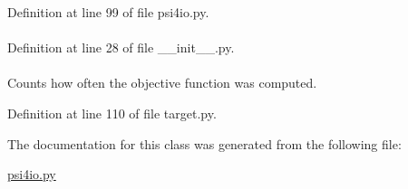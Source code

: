 \-Definition at line 99 of file psi4io.\-py.

\hypertarget{classforcebalance_1_1BaseClass_afd68efa29ccd2f320f4cf82198214aac}{
\paragraph[{verbose\-\_\-options}]{}}\label{classforcebalance_1_1BaseClass_afd68efa29ccd2f320f4cf82198214aac}


\-Definition at line 28 of file \-\_\-\-\_\-init\-\_\-\-\_\-.\-py.

\hypertarget{classforcebalance_1_1target_1_1Target_ad4cd0ab38d8fc97d3e7a6e22ce130a16}{
\paragraph[{xct}]{}}\label{classforcebalance_1_1target_1_1Target_ad4cd0ab38d8fc97d3e7a6e22ce130a16}


\-Counts how often the objective function was computed. 



\-Definition at line 110 of file target.\-py.



\-The documentation for this class was generated from the following file\-:\begin{DoxyCompactItemize}
\item 
\hyperlink{psi4io_8py}{psi4io.\-py}\end{DoxyCompactItemize}
